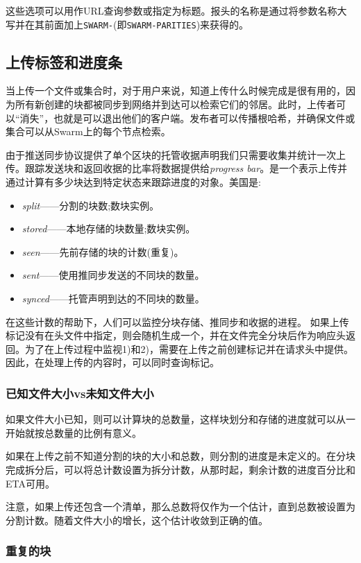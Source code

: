 这些选项可以用作URL查询参数或指定为标题。报头的名称是通过将参数名称大写并在其前面加上\lstinline{SWARM-}(即\lstinline{SWARM-PARITIES})来获得的。  


\subsection{上传标签和进度条\statusgreen}\label{sec:tags}
当上传一个文件或集合时，对于用户来说，知道上传什么时候完成是很有用的，因为所有新创建的块都被同步到网络并到达可以检索它们的邻居。此时，上传者可以“消失”，也就是可以退出他们的客户端。发布者可以传播根哈希，并确保文件或集合可以从Swarm上的每个节点检索。

由于推送同步协议提供了单个区块的托管收据声明我们只需要收集并统计一次上传。跟踪发送块和返回收据的比率将数据提供给\emph{progress bar}。是一个表示上传并通过计算有多少块达到特定状态来跟踪进度的对象。美国是: 

\begin{itemize}
\item \emph{split}——分割的块数;数块实例。
\item \emph{stored}——本地存储的块数量;数块实例。
\item \emph{seen}——先前存储的块的计数(重复)。
\item \emph{sent}——使用推同步发送的不同块的数量。
\item \emph{synced}——托管声明到达的不同块的数量。
\end{itemize}

在这些计数的帮助下，人们可以监控分块存储、推同步和收据的进程。
如果上传标记没有在头文件中指定，则会随机生成一个，并在文件完全分块后作为响应头返回。为了在上传过程中监视1)和2)，需要在上传之前创建标记并在请求头中提供。因此，在处理上传的内容时，可以同时查询标记。 

\subsubsection{已知文件大小vs未知文件大小}

如果文件大小已知，则可以计算块的总数量，这样块划分和存储的进度就可以从一开始就按总数量的比例有意义。

如果在上传之前不知道分割的块的大小和总数，则分割的进度是未定义的。在分块完成拆分后，可以将总计数设置为拆分计数，从那时起，剩余计数的进度百分比和ETA可用。

注意，如果上传还包含一个清单，那么总数将仅作为一个估计，直到总数被设置为分割计数。随着文件大小的增长，这个估计收敛到正确的值。


\subsubsection{重复的块}

